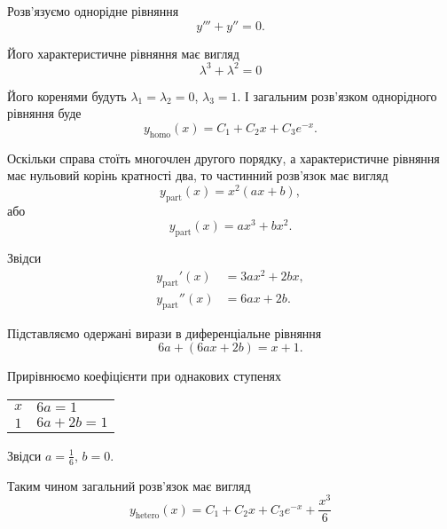 \begin{solution}
	Розв'язуємо однорідне рівняння
	\begin{equation*}
		y''' + y'' = 0.
	\end{equation*}

	Його характеристичне рівняння має вигляд
	\begin{equation*}
		\lambda^3 + \lambda^2 = 0
	\end{equation*}
	
	Його коренями будуть $\lambda_1 = \lambda_2 = 0$, $\lambda_3 = 1$. І загальним роз\-в'яз\-ком однорідного рівняння буде
	\begin{equation*}
		y_{\text{homo}}(x) = C_1 + C_2 x + C_3 e^{-x}.
	\end{equation*}

	Оскільки справа стоїть многочлен другого порядку, а характеристичне рівняння має нульовий корінь кратності два, то частинний розв'язок має вигляд 
	\begin{equation*}
		y_{\text{part}}(x) = x^2 (a x + b),
	\end{equation*}
	або
	\begin{equation*}
		y_{\text{part}}(x) = a x^3 + b x^2.
	\end{equation*}

	Звідси
	\begin{align*}
		y_{\text{part}}'(x) &= 3 a x^2 + 2 b x, \\
		y_{\text{part}}''(x) &= 6 a x + 2 b.
	\end{align*}

	Підставляємо одержані вирази в диференціальне рівняння
	\begin{equation*}
		6 a + (6 a x + 2 b) = x + 1.
	\end{equation*}

	Прирівнюємо коефіцієнти при однакових ступенях
	\begin{table}[H]
		\centering
		\begin{tabular}{c|l}
			$x$ & $6 a = 1$ \\
			$1$ & $6 a + 2 b = 1$
		\end{tabular}
	\end{table}

	Звідси $a = \frac16$, $b = 0$. \parvskip

	Таким чином загальний розв'язок має вигляд
	\begin{equation*}
		y_{\text{hetero}}(x) = C_1 + C_2 x + C_3 e^{-x} + \frac{x^3}{6}
	\end{equation*}
\end{solution}

